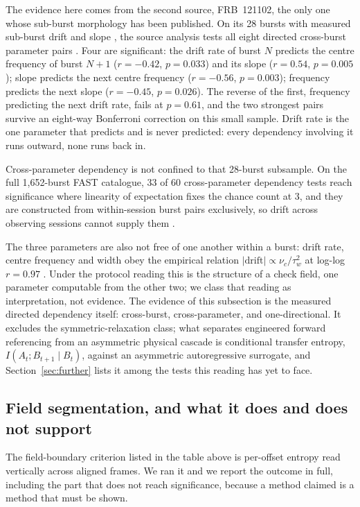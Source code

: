 \documentclass[11pt,a4paper]{article}
\begin{document}
The evidence here comes from the second source, FRB~121102, the only one whose
sub-burst morphology has been published. On its 28 bursts with measured sub-burst
drift and slope \cite{rajabi2020}, the source analysis tests all eight directed
cross-burst parameter pairs \cite{meucci2026}. Four are significant: the drift rate of burst $N$ predicts the
centre frequency of burst $N{+}1$ ($r = -0.42$, $p = 0.033$) and its slope ($r = 0.54$,
$p = 0.005$); slope predicts the next centre frequency ($r = -0.56$, $p = 0.003$);
frequency predicts the next slope ($r = -0.45$, $p = 0.026$). The reverse of the first,
frequency predicting the next drift rate, fails at $p = 0.61$, and the two strongest
pairs survive an eight-way Bonferroni correction on this small sample. Drift rate is
the one parameter that predicts and is never predicted: every dependency involving it
runs outward, none runs back in.

Cross-parameter dependency is not confined to that 28-burst subsample. On the full
1,652-burst FAST catalogue, 33 of 60 cross-parameter dependency tests reach
significance where linearity of expectation fixes the chance count at 3, and they are
constructed from within-session burst pairs exclusively, so drift across observing
sessions cannot supply them \cite{meucci2026}.

The three parameters are also not free of one another within a burst: drift rate,
centre frequency and width obey the empirical relation
$|\mathrm{drift}| \propto \nu_c / \tau_w^{2}$ at log-log $r = 0.97$ \cite{rajabi2020}.
Under the protocol reading this is the structure of a check field, one parameter
computable from the other two; we class that reading as interpretation, not evidence.
The evidence of this subsection is the measured directed dependency itself:
cross-burst, cross-parameter, and one-directional. It excludes the symmetric-relaxation
class; what separates engineered forward referencing from an asymmetric physical
cascade is conditional transfer entropy, $I(A_t; B_{t+1} \mid B_t)$, against an
asymmetric autoregressive surrogate, and Section~\ref{sec:further} lists it among the
tests this reading has yet to face.

\subsection{Field segmentation, and what it does and does not support}
\label{sec:fields}

The field-boundary criterion listed in the table above is per-offset entropy read
vertically across aligned frames. We ran it and we report the outcome in full, including
the part that does not reach significance, because a method claimed is a method that must
be shown.
\end{document}
